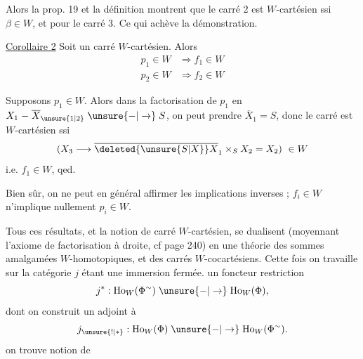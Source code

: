 Alors la prop. 19 et la définition montrent que le carré 2 est $W$-cartésien ssi $\beta\in W$, et  pour le carré 3. Ce qui achève la démonstration.

\uline{Corollaire 2} Soit
un carré $W$-cartésien.  Alors
\[
\begin{aligned}
p_1\in W&\Longrightarrow f_1\in W\\
p_2\in W&\Longrightarrow f_2\in W
\end{aligned}
\]


Supposons $p_1\in W$. Alors dans la factorisation de $p_1$ en $X_1\mathrel{-}\overline X_{\unsure{1|2}}\mathrel{\unsure{-|\to}} S$, on peut prendre $\overline X_1=S$, donc le carré est $W$-cartésien ssi
\[
(X_3\longrightarrow\overline{\deleted{\unsure{S|X}}X}_1\times_S X_2=X_2)\ \in W
\]
i.e. $f_1\in W$, qed.

Bien sûr, on ne peut en général affirmer les implications inverses ; $f_i\in W$ n'implique nullement $p_i\in W$.

Tous ces résultats, et la notion de carré $W$-cartésien, se dualisent (moyennant l'axiome  de factorisation à droite, cf page 240) en une théorie des sommes amalgamées $W$-homotopiques, et des carrés $W$-cocartésiens. Cette fois on travaille sur la catégorie
$j$ étant une immersion fermée.  un foncteur restriction
\[
j^*:\mathrm{Ho}_W(\Phi^{\sim})\mathrel{\unsure{-|\to}}\mathrm{Ho}_W(\Phi),
\]
dont on construit un adjoint à 
\[
j_{\unsure{!|*}}:\mathrm{Ho}_W(\Phi)\mathrel{\unsure{-|\to}}\mathrm{Ho}_W(\Phi^{\sim}).
\]
on trouve  notion  de
